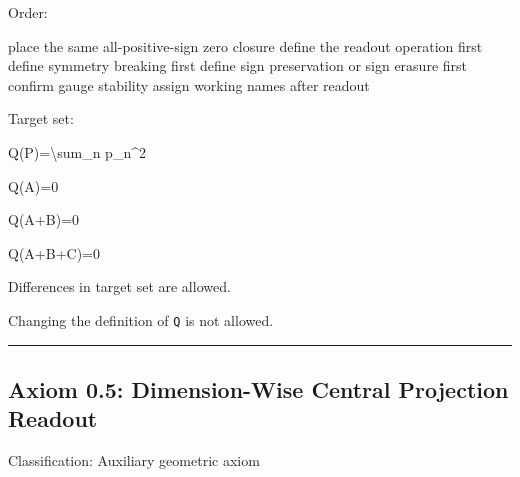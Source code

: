 \documentclass[
  a4paper]{article}
\newenvironment{Shaded}{}{}
\newcommand{\NormalTok}[1]{#1}
\begin{document}
Order:

\begin{Shaded}
\begin{Highlighting}[]
\NormalTok{place the same all{-}positive{-}sign zero closure}
\NormalTok{define the readout operation first}
\NormalTok{define symmetry breaking first}
\NormalTok{define sign preservation or sign erasure first}
\NormalTok{confirm gauge stability}
\NormalTok{assign working names after readout}
\end{Highlighting}
\end{Shaded}

Target set:

\begin{Shaded}
\begin{Highlighting}[]
\NormalTok{Q(P)=\textbackslash{}sum\_n p\_n\^{}2}
\end{Highlighting}
\end{Shaded}

\begin{Shaded}
\begin{Highlighting}[]
\NormalTok{Q(A)=0}
\end{Highlighting}
\end{Shaded}

\begin{Shaded}
\begin{Highlighting}[]
\NormalTok{Q(A+B)=0}
\end{Highlighting}
\end{Shaded}

\begin{Shaded}
\begin{Highlighting}[]
\NormalTok{Q(A+B+C)=0}
\end{Highlighting}
\end{Shaded}

Differences in target set are allowed.

Changing the definition of \texttt{Q} is not allowed.

\begin{center}\rule{0.5\linewidth}{0.5pt}\end{center}

\subsection{Axiom 0.5: Dimension-Wise Central Projection
Readout}\label{axiom-0.5-dimension-wise-central-projection-readout}

Classification: Auxiliary geometric axiom
\end{document}
